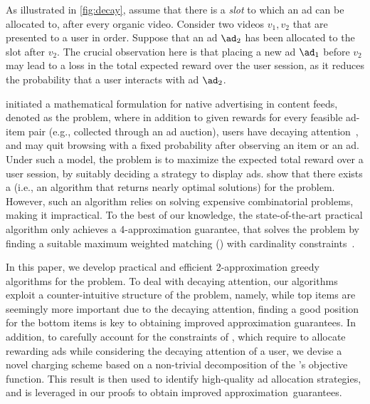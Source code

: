 \begin{example}\label{example:decay}
	As illustrated in \cref{fig:decay}, 
	assume that there is a \emph{slot} to which an ad can be allocated to, after every organic video.
	Consider two videos $v_1, v_2$ that are presented to a user in order.
	Suppose that an ad $\ad_2$ has been allocated to the slot after $v_2$.
	The crucial observation here is that 
	placing a new ad
	$\ad_1$ before $v_2$ 
	may lead to a loss in the total expected reward over the user session,
	as it reduces the probability that a user interacts with ad $\ad_2$.
\end{example}


\citet{ieong2014advertising} initiated a mathematical formulation for native advertising in content feeds,
denoted as the \streamads problem,
where in addition to %
given rewards for every feasible ad-item pair (e.g., collected through an ad auction),
users have %
decaying attention~\citep{craswell2008experimental}, and may quit browsing with a fixed probability after observing an item or an ad. 
Under such a model, the \streamads problem is to maximize the expected total reward over a user session, by suitably deciding a strategy to display ads.
\citet{ieong2014advertising} show that there exists a \PTAS (i.e., an algorithm that returns nearly optimal solutions) for the \streamads problem.
However, such an algorithm 
relies on solving expensive combinatorial problems, making it impractical.
To the best of our knowledge, the state-of-the-art practical algorithm only achieves a 4-approximation guarantee, %
that solves the problem by finding a suitable maximum weighted matching (\mwm) with %
cardinality constraints~\citep{ieong2014advertising}. 

In this paper, we develop practical and efficient 2-approximation greedy algorithms for the \streamads problem.
To deal with decaying attention,
our algorithms exploit a counter-intuitive structure of the problem, namely,
while top items are seemingly more important due to the decaying attention, 
finding a good position for the bottom items is key to obtaining improved approximation guarantees.
In addition, to carefully account for the constraints of \streamads, 
which require to allocate rewarding ads while considering the decaying attention of a user,
we devise a novel charging scheme based on a %
non-trivial decomposition of the \streamads's objective function. 
This result is then used to identify high-quality ad allocation strategies, and 
is leveraged in our proofs to obtain improved approximation~guarantees.

